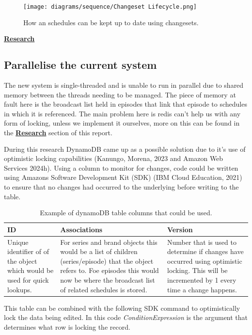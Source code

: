 \begin{figure}[H]
  \centering
  \texttt{[image: diagrams/sequence/Changeset Lifecycle.png]}
  \caption{How an schedules can be kept up to date using changesets.}
  \label{fig:changsetLifecycle}
\end{figure}

\newpage
\hyperref[sec:storageSolutions]{\textbf{Research}}
\subsection{Parallelise the current system}
The new system is single-threaded and is unable to run in parallel due to shared memory between the threads needing to be managed. The piece of memory
at fault here is the broadcast list held in episodes that link that episode to schedules in which it is referenced. The main problem here is redis 
can't help us with any form of locking, unless we implement it ourselves, more on this can be found in the \hyperref[sec:storageSolutions]{\textbf{Research}}
section of this report.

During this research DynamoDB came up as a possible solution due to it's use of optimistic locking capabilities 
(Kanungo, Morena, 2023 and Amazon Web Services 2024h). Using a column to monitor for changes, code could be written using Amazons Software Development
Kit (SDK) (IBM Cloud Education, 2021) to ensure that no changes had occurred to the underlying before writing to the table. 

\begin{table}[H]
  \centering
  \begin{tabular}{|p{}|p{}|p{}|}
    \hline
    ID & Associations & Version \\ \hline
    Unique identifier of of the object which would be used for quick lookups. 
    & For series and brand objects this would be a list of children (series/episode) that the object refers to. Foe episodes this would now be 
    where the broadcast list of related schedules is stored.
    & Number that is used to determine if changes have occurred using optimistic locking. This will be incremented by 1 every time a change happens. \\ \hline
  \end{tabular}
  \caption{Example of dynamoDB table columns that could be used.}
\end{table}

This table can be combined with the following SDK command to optimistically lock the data being edited. In this code \emph{ConditionExpression} is 
the argument that determines what row is locking the record.

